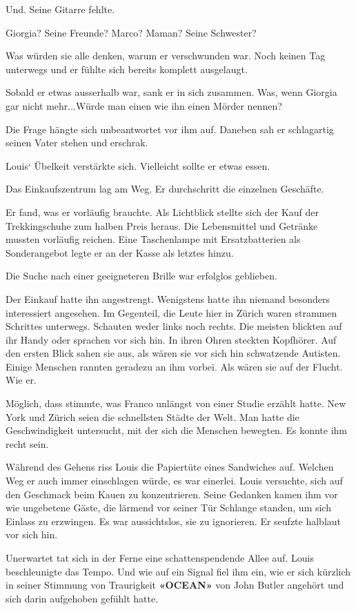 Und. Seine Gitarre fehlte.

Giorgia? Seine Freunde? Marco? Maman? Seine Schwester?

Was würden sie alle denken, warum er verschwunden war. Noch keinen Tag
unterwegs und er fühlte sich bereits komplett ausgelaugt.

Sobald er etwas ausserhalb war, sank er in sich zusammen. Was, wenn
Giorgia gar nicht mehr...Würde man einen wie ihn einen Mörder nennen?

Die Frage hängte sich unbeantwortet vor ihm auf. Daneben sah er
schlagartig seinen Vater stehen und erschrak.

Louis` Übelkeit verstärkte sich. Vielleicht sollte er etwas essen.

Das Einkaufszentrum lag am Weg. Er durchschritt die einzelnen Geschäfte.

Er fand, was er vorläufig brauchte. Als Lichtblick stellte sich der Kauf
der Trekkingschuhe zum halben Preis heraus. Die Lebensmittel und
Getränke mussten vorläufig reichen. Eine Taschenlampe mit
Ersatzbatterien als Sonderangebot legte er an der Kasse als letztes
hinzu.

Die Suche nach einer geeigneteren Brille war erfolglos geblieben.

Der Einkauf hatte ihn angestrengt. Wenigstens hatte ihn niemand
besonders interessiert angesehen. Im Gegenteil, die Leute hier in Zürich
waren strammen Schrittes unterwegs. Schauten weder links noch rechts.
Die meisten blickten auf ihr Handy oder sprachen vor sich hin. In ihren
Ohren steckten Kopfhörer. Auf den ersten Blick sahen sie aus, als wären
sie vor sich hin schwatzende Autisten. Einige Menschen rannten geradezu
an ihm vorbei. Als wären sie auf der Flucht. Wie er.

Möglich, dass stimmte, was Franco unlängst von einer Studie erzählt
hatte. New York und Zürich seien die schnellsten Städte der Welt. Man
hatte die Geschwindigkeit untersucht, mit der sich die Menschen
bewegten. Es konnte ihm recht sein.

Während des Gehens riss Louis die Papiertüte eines Sandwiches auf.
Welchen Weg er auch immer einschlagen würde, es war einerlei. Louis
versuchte, sich auf den Geschmack beim Kauen zu konzentrieren. Seine
Gedanken kamen ihm vor wie ungebetene Gäste, die lärmend vor seiner Tür
Schlange standen, um sich Einlass zu erzwingen. Es war aussichtslos, sie
zu ignorieren. Er seufzte halblaut vor sich hin.

Unerwartet tat sich in der Ferne eine schattenspendende Allee auf. Louis
beschleunigte das Tempo. Und wie auf ein Signal fiel ihm ein, wie er
sich kürzlich in seiner Stimmung von Traurigkeit \textbf{«OCEAN»} von
John Butler angehört und sich darin aufgehoben gefühlt hatte.

